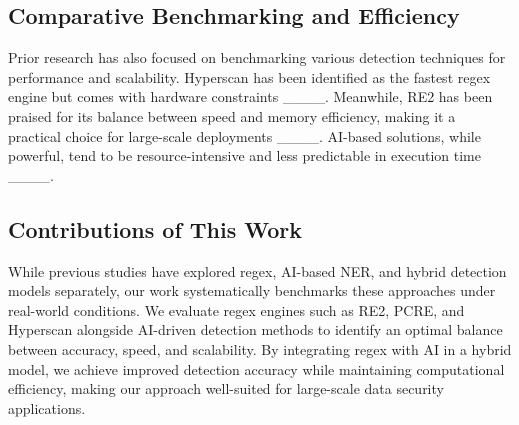 \subsection{Comparative Benchmarking and Efficiency}
Prior research has also focused on benchmarking various detection techniques for performance and scalability. Hyperscan has been identified as the fastest regex engine but comes with hardware constraints ____. Meanwhile, RE2 has been praised for its balance between speed and memory efficiency, making it a practical choice for large-scale deployments ____. AI-based solutions, while powerful, tend to be resource-intensive and less predictable in execution time ____.

\subsection{Contributions of This Work}
While previous studies have explored regex, AI-based NER, and hybrid detection models separately, our work systematically benchmarks these approaches under real-world conditions. We evaluate regex engines such as RE2, PCRE, and Hyperscan alongside AI-driven detection methods to identify an optimal balance between accuracy, speed, and scalability. By integrating regex with AI in a hybrid model, we achieve improved detection accuracy while maintaining computational efficiency, making our approach well-suited for large-scale data security applications.